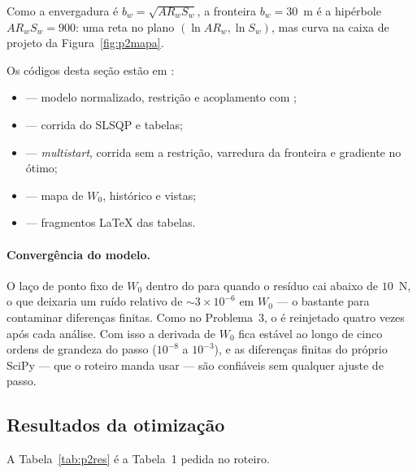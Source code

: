 Como a envergadura é $b_w = \sqrt{AR_w S_w}$, a fronteira $b_w = 30$~m
é a hipérbole $AR_w S_w = 900$: uma reta no plano
$(\ln AR_w, \ln S_w)$, mas curva na caixa de projeto da
Figura~\ref{fig:p2mapa}.

Os códigos desta seção estão em
:
\begin{itemize}
\item {} --- modelo normalizado, restrição e
      acoplamento com ;
\item {} --- corrida do SLSQP e tabelas;
\item {} --- \emph{multistart}, corrida sem a
      restrição, varredura da fronteira e gradiente no ótimo;
\item {} --- mapa de $W_0$, histórico e vistas;
\item {} --- fragmentos LaTeX das tabelas.
\end{itemize}

\paragraph{Convergência do modelo.}
O laço de ponto fixo de $W_0$ dentro do  para quando o
resíduo cai abaixo de $10$~N, o que deixaria um ruído relativo de
$\sim 3\times 10^{-6}$ em $W_0$ --- o bastante para contaminar diferenças
finitas. Como no Problema~3, o  é reinjetado quatro vezes
após cada análise. Com isso a derivada de $W_0$ fica estável ao longo de
cinco ordens de grandeza do passo ($10^{-8}$ a $10^{-3}$), e as
diferenças finitas do próprio SciPy --- que o roteiro manda usar --- são
confiáveis sem qualquer ajuste de passo.

\subsection{Resultados da otimização}
\label{sec:p2q1}

A Tabela~\ref{tab:p2res} é a Tabela~1 pedida no roteiro.

\begin{table}[H]
\centering
\caption{Resultados da otimização da aeronave padrão.}
\label{tab:p2res}
\small

\end{table}

